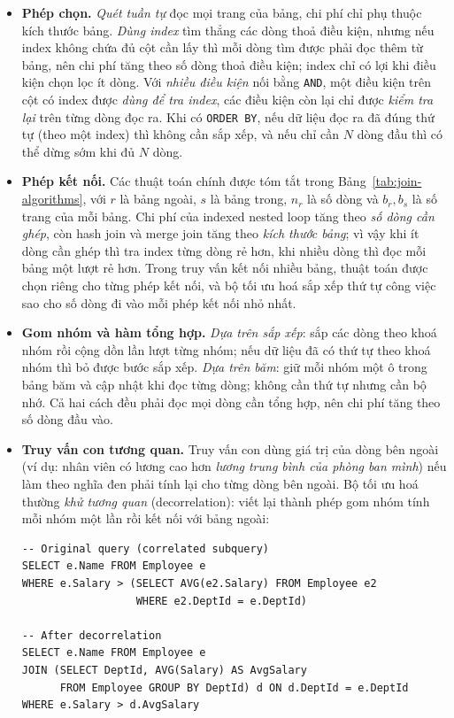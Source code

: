 \begin{itemize}
    \item \textbf{Phép chọn.} \textit{Quét tuần tự} đọc mọi trang của bảng, chi phí chỉ phụ thuộc kích thước bảng. \textit{Dùng index} tìm thẳng các dòng thoả điều kiện, nhưng nếu index không chứa đủ cột cần lấy thì mỗi dòng tìm được phải đọc thêm từ bảng, nên chi phí tăng theo số dòng thoả điều kiện; index chỉ có lợi khi điều kiện chọn lọc ít dòng. Với \textit{nhiều điều kiện} nối bằng \texttt{AND}, một điều kiện trên cột có index được \textit{dùng để tra index}, các điều kiện còn lại chỉ được \textit{kiểm tra lại} trên từng dòng đọc ra. Khi có \texttt{ORDER BY}, nếu dữ liệu đọc ra đã đúng thứ tự (theo một index) thì không cần sắp xếp, và nếu chỉ cần $N$ dòng đầu thì có thể dừng sớm khi đủ $N$ dòng.

    \item \textbf{Phép kết nối.} Các thuật toán chính được tóm tắt trong Bảng~\ref{tab:join-algorithms}, với $r$ là bảng ngoài, $s$ là bảng trong, $n_r$ là số dòng và $b_r, b_s$ là số trang của mỗi bảng. Chi phí của indexed nested loop tăng theo \textit{số dòng cần ghép}, còn hash join và merge join tăng theo \textit{kích thước bảng}; vì vậy khi ít dòng cần ghép thì tra index từng dòng rẻ hơn, khi nhiều dòng thì đọc mỗi bảng một lượt rẻ hơn. Trong truy vấn kết nối nhiều bảng, thuật toán được chọn riêng cho từng phép kết nối, và bộ tối ưu hoá sắp xếp thứ tự công việc sao cho số dòng đi vào mỗi phép kết nối nhỏ nhất.

    \item \textbf{Gom nhóm và hàm tổng hợp.} \textit{Dựa trên sắp xếp}: sắp các dòng theo khoá nhóm rồi cộng dồn lần lượt từng nhóm; nếu dữ liệu đã có thứ tự theo khoá nhóm thì bỏ được bước sắp xếp. \textit{Dựa trên băm}: giữ mỗi nhóm một ô trong bảng băm và cập nhật khi đọc từng dòng; không cần thứ tự nhưng cần bộ nhớ. Cả hai cách đều phải đọc mọi dòng cần tổng hợp, nên chi phí tăng theo số dòng đầu vào.

    \item \textbf{Truy vấn con tương quan.} Truy vấn con dùng giá trị của dòng bên ngoài (ví dụ: nhân viên có lương cao hơn \textit{lương trung bình của phòng ban mình}) nếu làm theo nghĩa đen phải tính lại cho từng dòng bên ngoài. Bộ tối ưu hoá thường \textit{khử tương quan} (decorrelation): viết lại thành phép gom nhóm tính mỗi nhóm một lần rồi kết nối với bảng ngoài:
\begin{verbatim}
-- Original query (correlated subquery)
SELECT e.Name FROM Employee e
WHERE e.Salary > (SELECT AVG(e2.Salary) FROM Employee e2
                  WHERE e2.DeptId = e.DeptId)

-- After decorrelation
SELECT e.Name FROM Employee e
JOIN (SELECT DeptId, AVG(Salary) AS AvgSalary
      FROM Employee GROUP BY DeptId) d ON d.DeptId = e.DeptId
WHERE e.Salary > d.AvgSalary
\end{verbatim}
\end{itemize}

